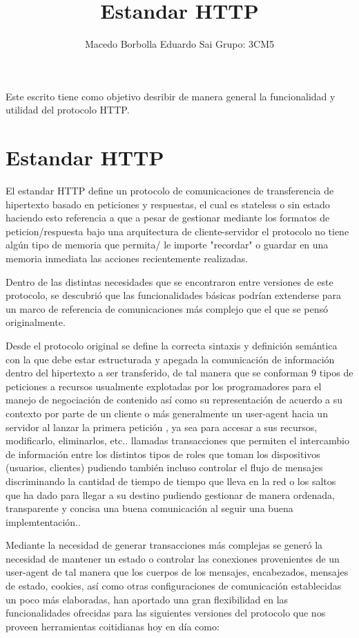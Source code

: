 \documentclass[12pt]{article}
\title{Estandar HTTP}
\author{Macedo Borbolla Eduardo Sai \inst{1}Grupo: 3CM5 }
\begin{document}
 

\maketitle

\begin{Resumen}
 Este escrito tiene como objetivo desribir de manera general la funcionalidad y utilidad del protocolo HTTP. 
\end{Resumen}


\section{Estandar HTTP}

El estandar HTTP define un protocolo de comunicaciones de transferencia de hipertexto basado en peticiones y respuestas, el cual es stateless o sin estado
haciendo esto referencia a que a pesar de gestionar mediante los formatos de peticion/respuesta bajo una arquitectura de cliente-servidor el protocolo no tiene algún tipo de memoria que permita/ le importe "recordar" o guardar en una memoria inmediata las acciones recientemente realizadas.

Dentro de las distintas necesidades que se encontraron entre versiones de este protocolo, se descubrió que las funcionalidades básicas podrían extenderse para un marco
de referencia de comunicaciones más complejo que el que se pensó originalmente.

Desde el protocolo original se define la correcta sintaxis y definición semántica con la que debe estar estructurada y apegada la comunicación de información  dentro del hipertexto a ser transferido, de tal manera que se conforman  9 tipos de peticiones a recursos  usualmente explotadas por los programadores para el manejo de negociación de contenido así como su representación de acuerdo a su contexto por parte de un cliente o más generalmente un user-agent hacia  un servidor al lanzar la primera petición , ya sea para accesar a sus recursos, modificarlo, eliminarlos, etc.. llamadas transacciones que permiten 
el intercambio de información entre los distintos tipos de roles que toman los dispositivos  (usuarios, clientes) pudiendo también incluso controlar el flujo de mensajes discriminando la cantidad de tiempo de tiempo que lleva en la red o los saltos que ha dado para llegar a su destino pudiendo gestionar de manera ordenada, transparente y concisa una buena comunicación al seguir una buena implemtentación..

Mediante la necesidad de generar transacciones más complejas se generó la necesidad de mantener un estado o controlar las conexiones provenientes de un user-agent de tal manera que los cuerpos de los mensajes,
encabezados, mensajes de estado, cookies, así  como otras  configuraciones de comunicación establecidas un poco más elaboradas, han aportado   una gran flexibilidad en las funcionalidades ofrecidas para las siguientes versiones del protocolo que nos proveen herramientas coitidianas hoy en día como:
\end{document}
